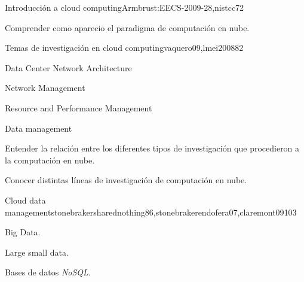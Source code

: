 \begin{syllabus}
\begin{unit}{Introducción a cloud computing}{Armbrust:EECS-2009-28,nistcc}{7}{2}
   \begin{topics}
        \item \ARDistributedArchitecturesTopicNetwork%
        \item \SESpecializedSystemsTopicClient%
        \item \SESpecializedSystemsTopicDistributed%
        \item \SESpecializedSystemsTopicParallel%
        \item \SESpecializedSystemsTopicWeb%
   \end{topics}

   \begin{unitgoals}
        \item \ARDistributedArchitecturesObjSIX%
        \item \SESpecializedSystemsObjONE%
        \item \SESpecializedSystemsObjFIVE%
        \item Comprender como aparecio el paradigma de computación en nube.
   \end{unitgoals}
\end{unit}

\begin{unit}{Temas de investigación en cloud computing}{vaquero09,lmei2008}{8}{2}
   \begin{topics}
        \item Data Center Network Architecture
        \item Network Management
        \item Resource and Performance Management
        \item Data management
   \end{topics}

   \begin{unitgoals}
        \item Entender la relación entre los diferentes tipos de investigación que procedieron a la computación en nube.
        \item Conocer distintas líneas de investigación de computación en nube.
   \end{unitgoals}
\end{unit}

\begin{unit}{Cloud data management}{stonebrakersharednothing86,stonebrakerendofera07,claremont09}{10}{3}
   \begin{topics}
      \item \IMInformationModelsTopicInformationStorage%
      \item \IMInformationModelsTopicSearch%
      \item \IMInformationModelsTopicScalability%
      \item \IMDatabaseSystemsTopicDatabase%
      \item \IMDistributedDatabasesAllTopics%
      \item Big Data.
      \item Large small data.
      \item Bases de datos {\it NoSQL}.
   \end{topics}


\end{unit}
\end{syllabus}
